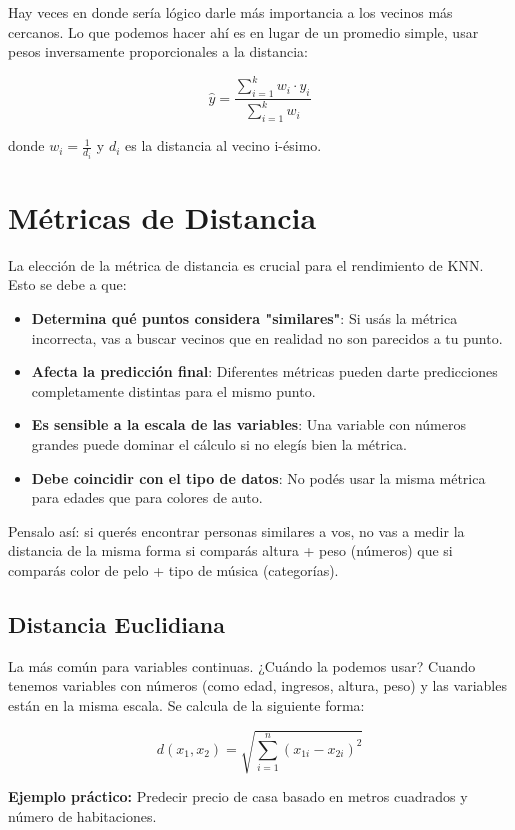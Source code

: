 \documentclass[12pt]{article}
\begin{document}
Hay veces en donde sería lógico darle más importancia a los vecinos más cercanos. Lo que podemos hacer ahí es en lugar de un promedio simple, usar pesos inversamente proporcionales a la distancia:

\[\hat{y} = \frac{\sum_{i=1}^{k} w_i \cdot y_i}{\sum_{i=1}^{k} w_i}\]

donde \(w_i = \frac{1}{d_i}\) y \(d_i\) es la distancia al vecino i-ésimo.

\section{Métricas de Distancia}

La elección de la métrica de distancia es crucial para el rendimiento de KNN. Esto se debe a que:

\begin{itemize}
    \item \textbf{Determina qué puntos considera "similares"}: Si usás la métrica incorrecta, vas a buscar vecinos que en realidad no son parecidos a tu punto.
    \item \textbf{Afecta la predicción final}: Diferentes métricas pueden darte predicciones completamente distintas para el mismo punto.
    \item \textbf{Es sensible a la escala de las variables}: Una variable con números grandes puede dominar el cálculo si no elegís bien la métrica.
    \item \textbf{Debe coincidir con el tipo de datos}: No podés usar la misma métrica para edades que para colores de auto.
\end{itemize}

Pensalo así: si querés encontrar personas similares a vos, no vas a medir la distancia de la misma forma si comparás altura + peso (números) que si comparás color de pelo + tipo de música (categorías). 

\subsection{Distancia Euclidiana}

La más común para variables continuas. ¿Cuándo la podemos usar? Cuando tenemos variables con números (como edad, ingresos, altura, peso) y las variables están en la misma escala. Se calcula de la siguiente forma:

\[d(x_1, x_2) = \sqrt{\sum_{i=1}^{n} (x_{1i} - x_{2i})^2}\]

\textbf{Ejemplo práctico:} Predecir precio de casa basado en metros cuadrados y número de habitaciones.
\end{document}
